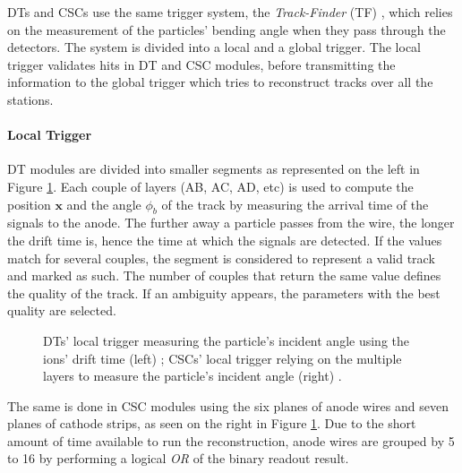     				DTs and CSCs use the same trigger system, the \emph{Track-Finder} (TF) \Cite{Track_Finder}, which relies on the measurement of the particles' bending angle when they pass through the detectors. The system is divided into a local and a global trigger. The local trigger validates hits in DT and CSC modules, before transmitting the information to the global trigger which tries to reconstruct tracks over all the stations.

    				\paragraph*{Local Trigger}
    				\label{sec:trigger_system_and_reconstruction_algorithms__local_trigger}

    					DT modules are divided into smaller segments as represented on the left in Figure \ref{fig:trigger_system_and_reconstruction_algorithms__dt_local}. Each couple of layers (AB, AC, AD, etc) is used to compute the position $ \mathbf{x} $ and the angle $ \phi_b $ of the track by measuring the arrival time of the signals to the anode. The further away a particle passes from the wire, the longer the drift time is, hence the time at which the signals are detected. If the values match for several couples, the segment is considered to represent a valid track and marked as such. The number of couples that return the same value defines the quality of the track. If an ambiguity appears, the parameters with the best quality are selected. \\

    					\begin{figure}[h!]
    						\centering
    						\caption{DTs' local trigger measuring the particle's incident angle using the ions' drift time (left) \Cite{CMS_at_LHC}; CSCs' local trigger relying on the multiple layers to measure the particle's incident angle (right) \Cite{Trigger_Muon}.}
    						\label{fig:trigger_system_and_reconstruction_algorithms__dt_local}
    					\end{figure}

    					The same is done in CSC modules using the six planes of anode wires and seven planes of cathode strips, as seen on the right in Figure \ref{fig:trigger_system_and_reconstruction_algorithms__dt_local}. Due to the short amount of time available to run the reconstruction, anode wires are grouped by 5 to 16 by performing a logical \emph{OR} of the binary readout result.

